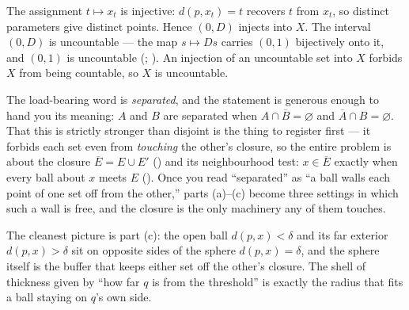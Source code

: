 \documentclass[main.tex]{subfiles}
\begin{document}
\begin{SolutionBlue}
The assignment $t\mapsto x_{t}$ is injective: $d(p,x_{t})=t$ recovers $t$ from $x_{t}$, so distinct
parameters give distinct points. Hence $(0,D)$ injects into $X$. The interval $(0,D)$ is uncountable
--- the map $s\mapsto Ds$ carries $(0,1)$ bijectively onto it, and $(0,1)$ is uncountable
(; ). An injection of an uncountable
set into $X$ forbids $X$ from being countable, so $X$ is uncountable.
\end{SolutionBlue}

\begin{Reflection}
The load-bearing word is \emph{separated}, and the statement is generous enough to hand you its
meaning: $A$ and $B$ are separated when $A\cap\overline{B}=\varnothing$ and $\overline{A}\cap
B=\varnothing$. That this is strictly stronger than disjoint is the thing to register first --- it
forbids each set even from \emph{touching} the other's closure, so the entire problem is about the
closure $\overline{E}=E\cup E'$ () and its neighbourhood test: $x\in\overline{E}$ exactly
when every ball about $x$ meets $E$ (). Once you read ``separated'' as ``a ball walls each
point of one set off from the other,'' parts (a)--(c) become three settings in which such a wall is
free, and the closure is the only machinery any of them touches.

The cleanest picture is part (c): the open ball $d(p,x)<\delta$ and its far exterior $d(p,x)>\delta$
sit on opposite sides of the sphere $d(p,x)=\delta$, and the sphere itself is the buffer that keeps
either set off the other's closure. The shell of thickness given by ``how far $q$ is from the
threshold'' is exactly the radius that fits a ball staying on $q$'s own side.


\end{Reflection}
\end{document}
